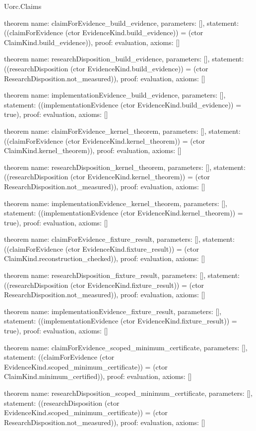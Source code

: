 \begin{lexlean}{Uorc.Claims}
\begin{semanticmodule}
theorem{
  name: claimForEvidence_build_evidence,
  parameters: [],
  statement: ((claimForEvidence (ctor EvidenceKind.build_evidence)) = (ctor ClaimKind.build_evidence)),
  proof: evaluation{},
  axioms: []
}

theorem{
  name: researchDisposition_build_evidence,
  parameters: [],
  statement: ((researchDisposition (ctor EvidenceKind.build_evidence)) = (ctor ResearchDisposition.not_measured)),
  proof: evaluation{},
  axioms: []
}

theorem{
  name: implementationEvidence_build_evidence,
  parameters: [],
  statement: ((implementationEvidence (ctor EvidenceKind.build_evidence)) = true),
  proof: evaluation{},
  axioms: []
}

theorem{
  name: claimForEvidence_kernel_theorem,
  parameters: [],
  statement: ((claimForEvidence (ctor EvidenceKind.kernel_theorem)) = (ctor ClaimKind.kernel_theorem)),
  proof: evaluation{},
  axioms: []
}

theorem{
  name: researchDisposition_kernel_theorem,
  parameters: [],
  statement: ((researchDisposition (ctor EvidenceKind.kernel_theorem)) = (ctor ResearchDisposition.not_measured)),
  proof: evaluation{},
  axioms: []
}

theorem{
  name: implementationEvidence_kernel_theorem,
  parameters: [],
  statement: ((implementationEvidence (ctor EvidenceKind.kernel_theorem)) = true),
  proof: evaluation{},
  axioms: []
}

theorem{
  name: claimForEvidence_fixture_result,
  parameters: [],
  statement: ((claimForEvidence (ctor EvidenceKind.fixture_result)) = (ctor ClaimKind.reconstruction_checked)),
  proof: evaluation{},
  axioms: []
}

theorem{
  name: researchDisposition_fixture_result,
  parameters: [],
  statement: ((researchDisposition (ctor EvidenceKind.fixture_result)) = (ctor ResearchDisposition.not_measured)),
  proof: evaluation{},
  axioms: []
}

theorem{
  name: implementationEvidence_fixture_result,
  parameters: [],
  statement: ((implementationEvidence (ctor EvidenceKind.fixture_result)) = true),
  proof: evaluation{},
  axioms: []
}

theorem{
  name: claimForEvidence_scoped_minimum_certificate,
  parameters: [],
  statement: ((claimForEvidence (ctor EvidenceKind.scoped_minimum_certificate)) = (ctor ClaimKind.minimum_certified)),
  proof: evaluation{},
  axioms: []
}

theorem{
  name: researchDisposition_scoped_minimum_certificate,
  parameters: [],
  statement: ((researchDisposition (ctor EvidenceKind.scoped_minimum_certificate)) = (ctor ResearchDisposition.not_measured)),
  proof: evaluation{},
  axioms: []
}


\end{semanticmodule}
\end{lexlean}
